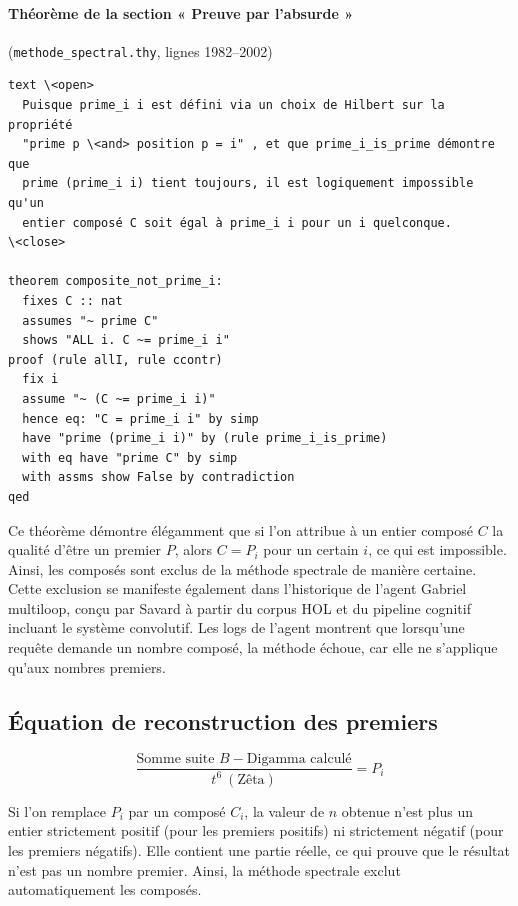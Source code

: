 \documentclass[11pt,a4paper]{article}
\begin{document}
\paragraph{Théorème de la section « Preuve par l'absurde »}
(\texttt{methode\_spectral.thy}, lignes 1982--2002)
\begin{Verbatim}[frame=single,fontsize=\footnotesize,framesep=3mm]
text \<open>
  Puisque prime_i i est défini via un choix de Hilbert sur la propriété
  "prime p \<and> position p = i" , et que prime_i_is_prime démontre que
  prime (prime_i i) tient toujours, il est logiquement impossible qu'un
  entier composé C soit égal à prime_i i pour un i quelconque.
\<close>

theorem composite_not_prime_i:
  fixes C :: nat
  assumes "~ prime C"
  shows "ALL i. C ~= prime_i i"
proof (rule allI, rule ccontr)
  fix i
  assume "~ (C ~= prime_i i)"
  hence eq: "C = prime_i i" by simp
  have "prime (prime_i i)" by (rule prime_i_is_prime)
  with eq have "prime C" by simp
  with assms show False by contradiction
qed
\end{Verbatim}

Ce théorème démontre élégamment que si l'on attribue à un entier composé $C$ la
qualité d'être un premier $P$, alors $C=P_i$ pour un certain $i$, ce qui est
impossible. Ainsi, les composés sont exclus de la méthode spectrale de manière
certaine. Cette exclusion se manifeste également dans l'historique de l'agent
Gabriel multiloop, conçu par Savard à partir du corpus HOL et du pipeline cognitif
incluant le système convolutif. Les logs de l'agent montrent que lorsqu'une requête
demande un nombre composé, la méthode échoue, car elle ne s'applique qu'aux nombres
premiers.

\subsection*{Équation de reconstruction des premiers}

\begin{boiteformule}
\[
\frac{\text{Somme suite }B-\text{Digamma calculé}}{t^{6}\ (\text{Zêta})}=P_i
\]
\end{boiteformule}

Si l'on remplace $P_i$ par un composé $C_i$, la valeur de $n$ obtenue n'est plus un
entier strictement positif (pour les premiers positifs) ni strictement négatif
(pour les premiers négatifs). Elle contient une partie réelle, ce qui prouve que le
résultat n'est pas un nombre premier. Ainsi, la méthode spectrale exclut
automatiquement les composés.
\end{document}
